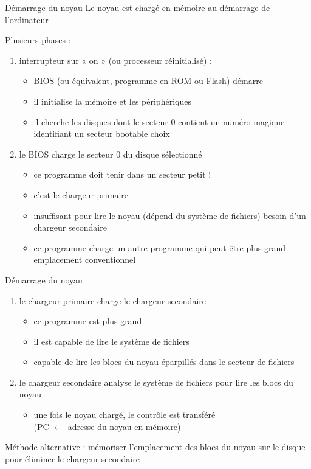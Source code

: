 \begin {frame} {Démarrage du noyau}
    Le noyau est chargé en mémoire au démarrage de l'ordinateur

    \vspace* {3mm}

    Plusieurs phases :
    \begin {enumerate}
	\addtocounter {enumi} {-1}
	\item interrupteur sur « on » (ou processeur réinitialisé) :
	    \begin {itemize}
		\item BIOS (ou équivalent, programme en ROM ou Flash)
		    démarre
		\item il initialise la mémoire et les périphériques
		\item il cherche les disques dont le secteur 0 contient
		    un numéro magique identifiant un secteur bootable
		    \implique choix
	    \end {itemize}
	\item le BIOS charge le secteur 0 du disque sélectionné
	    \begin {itemize}
		\item ce programme doit tenir dans un secteur \implique petit !
		\item c'est le chargeur primaire
		\item insuffisant pour lire le noyau (dépend du système
		    de fichiers) \implique besoin d'un chargeur secondaire
		\item ce programme charge un autre programme qui peut être
		    plus grand \implique emplacement conventionnel
	    \end {itemize}
    \end {enumerate}
\end {frame}

\begin {frame} {Démarrage du noyau}
    \begin {enumerate}
	\addtocounter {enumi} {1}
	\item le chargeur primaire charge le chargeur secondaire
	    \begin {itemize}
		\item ce programme est plus grand
		\item il est capable de lire le système de fichiers
		\item \implique capable de lire les blocs du noyau
		    éparpillés dans le secteur de fichiers
	    \end {itemize}

	\item le chargeur secondaire analyse le système de fichiers
	    pour lire les blocs du noyau
	    \begin {itemize}
		\item une fois le noyau chargé, le contrôle est
		    transféré \\
		    (PC $\leftarrow$ adresse du noyau en mémoire)
	    \end {itemize}
    \end {enumerate}

    Méthode alternative : mémoriser l'emplacement des blocs du
    noyau sur le disque pour éliminer le chargeur secondaire
\end {frame}

